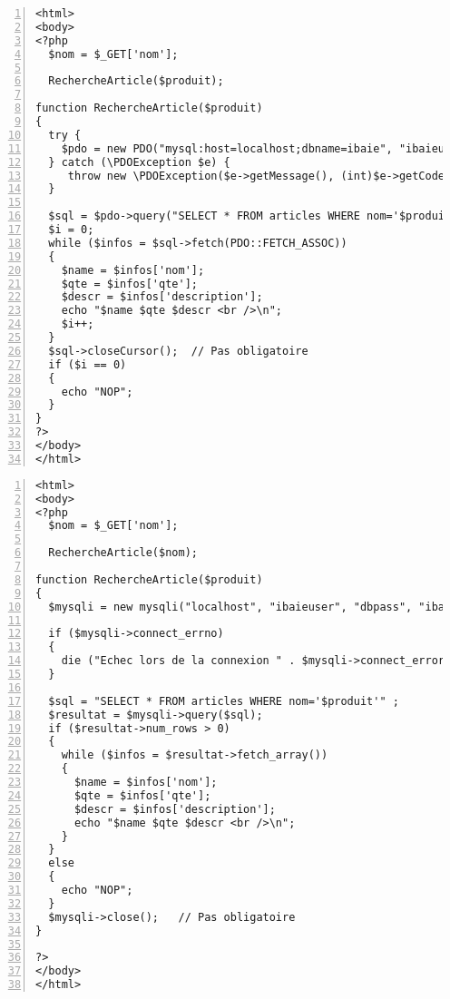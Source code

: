 \documentclass[11pt,a4paper]{article}
\begin{document}
\medskip

\lstset{language=php}
\begin{lstlisting}[frame=single,numbers=left]
<html>
<body>
<?php
  $nom = $_GET['nom'];

  RechercheArticle($produit);

function RechercheArticle($produit)
{
  try {
    $pdo = new PDO("mysql:host=localhost;dbname=ibaie", "ibaieuser", "dbpass");
  } catch (\PDOException $e) {
     throw new \PDOException($e->getMessage(), (int)$e->getCode());
  }

  $sql = $pdo->query("SELECT * FROM articles WHERE nom='$produit'");
  $i = 0;
  while ($infos = $sql->fetch(PDO::FETCH_ASSOC))
  {
    $name = $infos['nom'];
    $qte = $infos['qte'];
    $descr = $infos['description'];
    echo "$name $qte $descr <br />\n";
    $i++;
  }
  $sql->closeCursor();  // Pas obligatoire
  if ($i == 0)
  {
    echo "NOP";
  }
}
?>
</body>
</html>
\end{lstlisting}

\medskip

\lstset{language=php}
\begin{lstlisting}[frame=single,numbers=left]
<html>
<body>
<?php
  $nom = $_GET['nom'];
  
  RechercheArticle($nom);

function RechercheArticle($produit)
{
  $mysqli = new mysqli("localhost", "ibaieuser", "dbpass", "ibaie"); // fab / passbdd

  if ($mysqli->connect_errno)
  {
    die ("Echec lors de la connexion " . $mysqli->connect_error);
  }

  $sql = "SELECT * FROM articles WHERE nom='$produit'" ;
  $resultat = $mysqli->query($sql);
  if ($resultat->num_rows > 0)
  {
    while ($infos = $resultat->fetch_array())
    {
      $name = $infos['nom'];
      $qte = $infos['qte'];
      $descr = $infos['description'];
      echo "$name $qte $descr <br />\n";
    }
  }
  else
  {
    echo "NOP";
  }
  $mysqli->close();   // Pas obligatoire
}

?>
</body>
</html>
\end{lstlisting}
\end{document}
